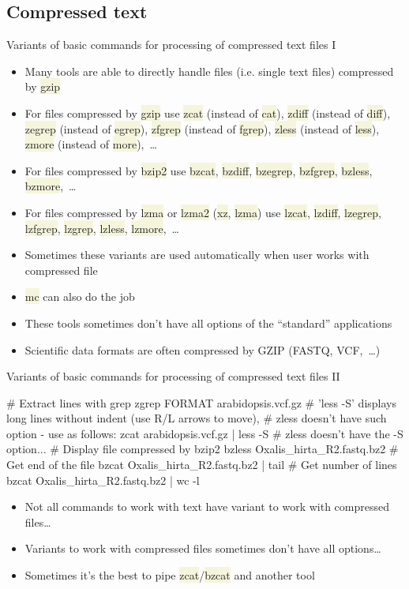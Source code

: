\documentclass[compress, xelatex, 11pt, xcolor=svgnames, aspectratio=169,
	hyperref={
		bookmarks=true,
		unicode=true,
		colorlinks=true,
		pdftitle={Linux, command line and MetaCentrum},
		plainpages=false,
		pdfauthor={Vojtech Zeisek},
		pdfsubject={Course about use of Linux command line, writing shell scripts and using MetaCentrum of CESNET},
		pdfcreator={XeLaTeX},
		pdfkeywords={Linux, GNU, BASH, shell, command line, MetaCentrum},
		linkcolor=DarkRed, %
		anchorcolor=DarkBlue, %
		citecolor=Indigo, %
		filecolor=NavyBlue, %
		menucolor=DarkMagenta, %
		urlcolor=DarkBlue, %
		},
	url={hyphens, lowtilde} %
	]{beamer}
\renewcommand{\texttt}[1]{\colorbox{Beige}{{\ttfamily #1}}}
\begin{document}
\subsection{Compressed text}

\begin{frame}{Variants of basic commands for processing of compressed text files I}
	\begin{itemize}
		\item Many tools are able to directly handle files (i.e. single text files) compressed by \texttt{gzip}
		\item For files compressed by \texttt{gzip} use \texttt{zcat} (instead of \texttt{cat}), \texttt{zdiff} (instead of \texttt{diff}), \texttt{zegrep} (instead of \texttt{egrep}), \texttt{zfgrep} (instead of \texttt{fgrep}), \texttt{zless} (instead of \texttt{less}), \texttt{zmore} (instead of \texttt{more}),~\ldots
		\item For files compressed by \texttt{bzip2} use \texttt{bzcat}, \texttt{bzdiff}, \texttt{bzegrep}, \texttt{bzfgrep}, \texttt{bzless}, \texttt{bzmore},~\ldots
		\item For files compressed by \texttt{lzma} or \texttt{lzma2} (\texttt{xz}, \texttt{lzma}) use \texttt{lzcat}, \texttt{lzdiff}, \texttt{lzegrep}, \texttt{lzfgrep}, \texttt{lzgrep}, \texttt{lzless}, \texttt{lzmore},~\ldots
		\item Sometimes these variants are used automatically when user works with compressed file
		\item \texttt{mc} can also do the job
		\item These tools sometimes don't have all options of the \enquote{standard} applications
		\item Scientific data formats are often compressed by GZIP (FASTQ, VCF,~\ldots)
	\end{itemize}
\end{frame}

\begin{frame}[fragile]{Variants of basic commands for processing of compressed text files II}
	\begin{bashcode}
    # Extract lines with grep
    zgrep FORMAT arabidopsis.vcf.gz
    # 'less -S' displays long lines without indent (use R/L arrows to move),
    # zless doesn't have such option - use as follows:
    zcat arabidopsis.vcf.gz | less -S # zless doesn't have the -S option...
    # Display file compressed by bzip2
    bzless Oxalis_hirta_R2.fastq.bz2
    # Get end of the file
    bzcat Oxalis_hirta_R2.fastq.bz2 | tail
    # Get number of lines
    bzcat Oxalis_hirta_R2.fastq.bz2 | wc -l
	\end{bashcode}
	\begin{itemize}
		\item Not all commands to work with text have variant to work with compressed files\ldots
		\item Variants to work with compressed files sometimes don't have all options\ldots
		\item Sometimes it's the best to pipe \texttt{zcat}/\texttt{bzcat} and another tool
	\end{itemize}
\end{frame}
\end{document}
